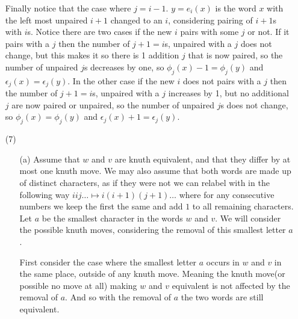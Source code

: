 \documentclass[12pt]{amsart}
\begin{document}
\begin{itemize}
    Finally notice that the case where $j=i-1$.
    $y=e_i(x)$ is the word $x$ with the left most unpaired $i+1$ changed to an $i$, 
    considering pairing of $i+1$s with $i$s. Notice there are two cases if 
    the new $i$ pairs with some $j$ or not.
    If it pairs with a $j$ then the number of $j+1=i$s, unpaired with a $j$ does not change, 
    but this makes it so there is 1 addition $j$ that is now paired, so the number of unpaired $j$s decreases by one, 
    so $\phi_j(x)-1=\phi_j(y)$ and $\epsilon_j(x)=\epsilon_j(y)$. In the other case 
    if the new $i$ does not pairs with a $j$ then the number of $j+1=i$s, unpaired with a $j$ increases by 1, 
    but no additional $j$ are now paired or unpaired, so the number of unpaired $j$s does not change, 
    so $\phi_j(x)=\phi_j(y)$ and $\epsilon_j(x)+1=\epsilon_j(y)$.\\


    
    \item[(7)] 
    \begin{itemize}
        \item[(a)] %
        Assume that $w$ and $v$ are knuth equivalent, 
        and that they differ by at most one knuth move. 
        We may also assume that both words are made up of distinct characters, 
        as if they were not we can relabel with in the following way 
        $iij\dots\mapsto i(i+1)(j+1)\dots$ where for any consecutive 
        numbers we keep the first the same and add $1$ to all remaining characters.
        Let $a$ be the smallest character in the words $w$ and $v$.
        We will consider the possible knuth moves, considering the removal of 
        this smallest letter $a$.

        First consider the case where the smallest letter $a$ occurs in $w$ and 
        $v$ in the same place, outside of any knuth move. 
        Meaning the knuth move(or possible no move at all) making $w$ and $v$ 
        equivalent is not affected by the removal of $a$. And so with the removal of $a$
        the two words are still equivalent.


\end{itemize}
\end{itemize}
\end{document}
